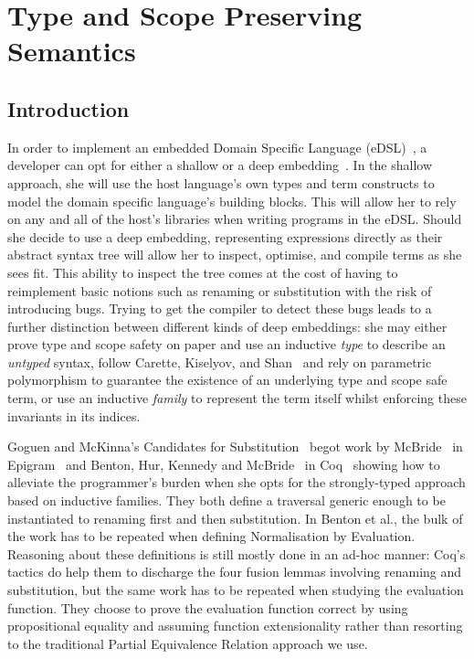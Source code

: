 
\chapter{Type and Scope Preserving Semantics}

\section*{Introduction}

In order to implement an embedded Domain Specific Language (eDSL)~\cite{hudak1996building},
a developer can opt for either a shallow or a deep
embedding~\cite{svenningsson2013combining,gill2014domain}. In the shallow approach, she
will use the host language's own types and term constructs to model the domain
specific language's building blocks. This will allow her to rely on any and all
of the host's libraries when writing programs in the eDSL. Should she decide
to use a deep embedding, representing expressions directly as their abstract
syntax tree will allow her to inspect, optimise, and compile terms as she sees
fit. This ability to inspect the tree comes at the cost of having to reimplement
basic notions such as renaming or substitution with the risk of introducing
bugs. Trying to get the compiler to detect these bugs leads to a further
distinction between different kinds of deep embeddings: she may either prove type
and scope safety on paper and use an inductive \emph{type} to describe an \emph{untyped}
syntax, follow Carette, Kiselyov, and Shan~\cite{carette2009finally} and rely on
parametric polymorphism to guarantee the existence of an underlying type and scope
safe term, or use an inductive \emph{family} to represent the term itself whilst
enforcing these invariants in its indices.

Goguen and McKinna's Candidates for Substitution~\cite{goguen1997candidates}
begot work by McBride~\cite{mcbride2005type} in Epigram~\cite{mcbride2004view}
and Benton, Hur, Kennedy and McBride~\cite{benton2012strongly} in Coq~\cite{Coq:manual}
showing how to alleviate the programmer's burden when she opts for the strongly-typed
approach based on inductive families. They both define a traversal generic enough to
be instantiated to renaming first and then substitution. In Benton et al., the bulk
of the work has to be repeated when defining Normalisation by Evaluation. Reasoning
about these definitions is still mostly done in an ad-hoc manner: Coq's tactics
do help them to discharge the four fusion lemmas involving renaming and substitution,
but the same work has to be repeated when studying the evaluation function. They
choose to prove the evaluation function correct by using propositional equality and
assuming function extensionality rather than resorting to the traditional Partial
Equivalence Relation approach we use.


